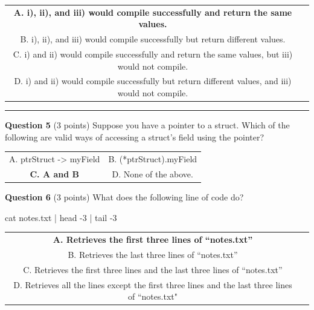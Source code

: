 \documentclass{exam}
\begin{document}
\begin{center}

\begin{tabular} { c  c } 
  \textbf{A. i), ii), and iii) would compile successfully and return the same values.}\\
  B. i), ii), and iii) would compile successfully but return different values. \\ 
  C. i) and ii) would compile successfully and return the same values, but iii) would not compile. \\ 
  D. i) and ii) would compile successfully but return different values, and iii) would not compile.
\end{tabular}

\end{center}

\vspace{10px}

\newpage




\begin{center}\noindent\rule{6in}{0.4pt}\end{center}

\textbf{Question 5} (3 points) Suppose you have a pointer to a struct. Which of the following are valid ways of accessing a struct’s field using the pointer?

\begin{center}

\begin{tabular} { c  c } 
  A. ptrStruct -> myField &
  B. (*ptrStruct).myField \\ 
  \textbf{C. A and B} &
  D. None of the above.
\end{tabular}

\end{center}

\vspace{10px}

\textbf{Question 6} (3 points) What does the following line of code do?

\begin{center}
cat notes.txt | head -3 | tail -3
\end{center}

\begin{center}

\begin{tabular} { c  c } 
  \textbf{A. Retrieves the first three lines of “notes.txt”}\\
  B. Retrieves the last three lines of “notes.txt” \\ 
  C. Retrieves the first three lines and the last three lines of “notes.txt” \\ 
  D. Retrieves all the lines except the first three lines and the last three lines of “notes.txt"
\end{tabular}

\end{center}
\end{document}
